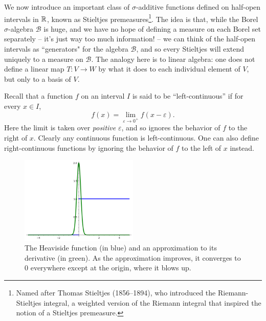 \begin{subsec}
We now introduce an important class of $\sigma$-additive functions defined on half-open intervals in $\mathbb{R}$, known as Stieltjes premeasures\footnote{Named after Thomas Stieltjes (1856--1894), who introduced the Riemann-Stieltjes integral, a weighted version of the Riemann integral that inspired the notion of a Stieltjes premeasure.}.
The idea is that, while the Borel $\sigma$-algebra $\mathcal B$ is huge, and we have no hope of defining a measure on each Borel set separately -- it's just way too much information! -- we can think of the half-open intervals as ``generators" for the algebra $\mathcal B$, and so every Stieltjes will extend uniquely to a measure on $\mathcal B$.
The analogy here is to linear algebra: one does not define a linear map $T: V \to W$ by what it does to each individual element of $V$, but only to a basis of $V$.
\end{subsec}

\begin{subsec}
Recall that a function $f$ on an interval $I$ is said to be ``left-continuous'' if for every $x \in I$,
\[f(x) = \lim_{\varepsilon \to 0^+} f(x - \varepsilon).\]
Here the limit is taken over \emph{positive} $\varepsilon$, and so ignores the behavior of $f$ to the right of $x$.
Clearly any continuous function is left-continuous.
One can also define right-continuous functions by ignoring the behavior of $f$ to the left of $x$ instead.
\end{subsec}

\begin{figure}
\label{Heaviside figure}
\caption{The Heaviside function (in blue) and an approximation to its derivative (in green).
As the approximation improves, it converges to $0$ everywhere except at the origin, where it blows up.}
\centering \includegraphics[width=0.5\textwidth]{graphics/heaviside}
\end{figure}

